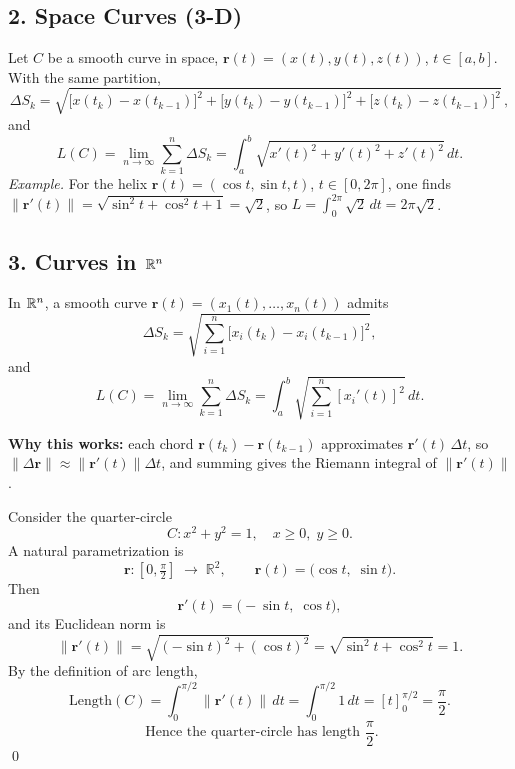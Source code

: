 \documentclass[11pt,openany]{article}
\begin{document}
\bigskip

\subsection*{2. Space Curves (3-D)}

Let \(C\) be a smooth curve in space,
\(\mathbf r(t)=(x(t),y(t),z(t))\), \(t\in[a,b]\).  With the same partition,
\[
\Delta S_k
=\sqrt{\bigl[x(t_k)-x(t_{k-1})\bigr]^2
	+\bigl[y(t_k)-y(t_{k-1})\bigr]^2
	+\bigl[z(t_k)-z(t_{k-1})\bigr]^2}\,,
\]
and 
\[
L(C)
=\lim_{n\to\infty}\sum_{k=1}^n\Delta S_k
=\int_a^b\sqrt{x'(t)^2+y'(t)^2+z'(t)^2}\,dt.
\]
\emph{Example.}  For the helix 
\(\mathbf r(t)=(\cos t,\sin t,t)\), \(t\in[0,2\pi]\), one finds
\(\|\mathbf r'(t)\|=\sqrt{\sin^2t+\cos^2t+1}=\sqrt2\),
so \(L=\int_0^{2\pi}\!\sqrt2\,dt=2\pi\sqrt2\).

\bigskip

\subsection*{3. Curves in \(\mathbb{R}^n\)}

In \(\mathbb{R}^n\), a smooth curve \(\mathbf r(t)=(x_1(t),\dots,x_n(t))\) admits
\[
\Delta S_k
=\sqrt{\sum_{i=1}^n\bigl[x_i(t_k)-x_i(t_{k-1})\bigr]^2},
\]
and
\[
L(C)
=\lim_{n\to\infty}\sum_{k=1}^n\Delta S_k
=\int_a^b\sqrt{\sum_{i=1}^n [x_i'(t)]^2}\,dt.
\]

\bigskip

\noindent\textbf{Why this works:} each chord  
\(\mathbf r(t_k)-\mathbf r(t_{k-1})\)  
approximates \(\mathbf r'(t)\,\Delta t\), so
\(\|\Delta\mathbf r\|\approx\|\mathbf r'(t)\|\Delta t\),  
and summing gives the Riemann integral of \(\|\mathbf r'(t)\|\).


Consider the quarter‐circle \[
C\colon x^2 + y^2 = 1,\quad x\ge0,\;y\ge0.
\]
A natural parametrization is
\[
\mathbf r\colon 
[0,\tfrac\pi2]\;\longrightarrow\;\mathbb{R}^2,
\qquad
\mathbf r(t) = \bigl(\cos t,\;\sin t\bigr).
\]
Then
\[
\mathbf r'(t)
= \bigl(-\sin t,\;\cos t\bigr),
\]
and its Euclidean norm is
\[
\bigl\|\mathbf r'(t)\bigr\|
= \sqrt{(-\sin t)^2 + (\cos t)^2}
=\sqrt{\sin^2t + \cos^2t}
=1.
\]
By the definition of arc length,
\[
\text{Length}(C)
= \int_{0}^{\pi/2} \bigl\|\mathbf r'(t)\bigr\|\,dt
= \int_{0}^{\pi/2}1\,dt
= \left[t\right]_{0}^{\pi/2}
= \frac\pi2.
\]
\[
\boxed{\;\text{Hence the quarter‐circle has length } \frac\pi2.\!}
\]
\qed
\end{document}

